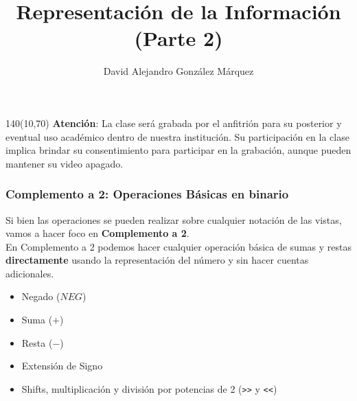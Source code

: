 \documentclass[aspectratio=169]{beamer}
\title{\Huge Representación de la Información\\ \Large (Parte 2)}
\author{David Alejandro González Márquez}
\date{}
\begin{document}
\begin{frame}[plain]
    \titlepage
    \begin{textblock}{140}(10,70)
    \textcolor{rojo}{
    \textbf{Atención}: La clase será grabada por el anfitrión para su posterior y eventual uso académico dentro de nuestra institución. Su participación en la clase implica brindar su consentimiento para participar en la grabación, aunque pueden mantener su video apagado.}
    \end{textblock}
\end{frame}


\begin{frame}[fragile]
    \frametitle{\textbf{Complemento a 2}: Operaciones Básicas en binario}
    Si bien las operaciones se pueden realizar sobre cualquier notación de las vistas,\\ vamos a hacer foco en \textbf{Complemento a 2}.\\
    \bigskip
    En Complemento a 2 podemos hacer cualquier operación básica de sumas y restas \textbf{directamente} usando la representación del número y sin hacer cuentas adicionales.\\
    \bigskip
    \begin{itemize}
     \item Negado ($NEG$)
     \item Suma ($+$)
     \item Resta ($-$)
     \item Extensión de Signo
     \item Shifts, multiplicación y división por potencias de 2 (\verb|>>| y \verb|<<|)
    \end{itemize}
\end{frame}
\end{document}
